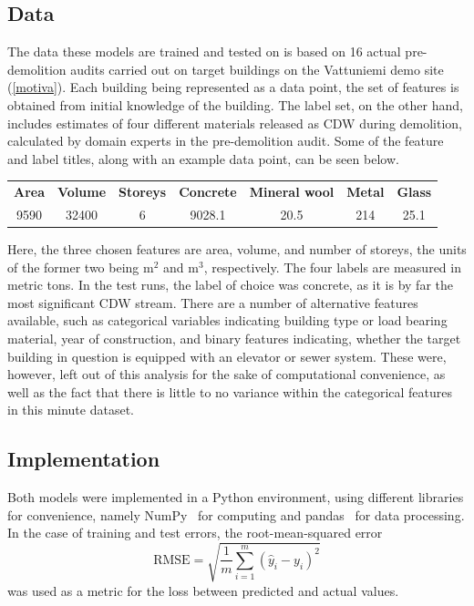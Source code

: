 \documentclass[english, 12pt, a4paper, sci, utf8, a-2b, online]{aaltothesis}
\begin{document}
\subsection{Data} \label{data}

The data these models are trained and tested on is based on 16 actual pre-demolition audits carried out on target buildings on the Vattuniemi demo site (\ref{motiva}).
Each building being represented as a data point, the set of features is obtained from initial knowledge of the building. The label set, on the other hand, includes estimates of four different
materials released as CDW during demolition, calculated by domain experts in the pre-demolition audit. Some of the feature and label titles, along with an example data point, can be seen below.

\begin{table}[h!]\label{datapoint}
  \centering
  \begin{tabular}{ccccccc}
    \textbf{Area} & \textbf{Volume} & \textbf{Storeys} & \textbf{Concrete} & \textbf{Mineral wool} & \textbf{Metal} & \textbf{Glass} \\
    9590          & 32400           & 6                & 9028.1            & 20.5                  & 214            & 25.1
  \end{tabular}
\end{table}
%
Here, the three chosen features are area, volume, and number of storeys, the units of the former two being $\text{m}^2$ and $\text{m}^3$, respectively. The four labels are measured in metric tons.
In the test runs, the label of choice was concrete, as it is by far the most significant CDW stream.
There are a number of alternative features available, such as categorical variables indicating building type or load bearing material, year of construction, and binary features indicating, whether
the target building in question is equipped with an elevator or sewer system. These were, however, left out of this analysis for the sake of computational convenience, as well as the fact that
there is little to no variance within the categorical features in this minute dataset.

\subsection{Implementation}

Both models were implemented in a Python environment, using different libraries for convenience, namely NumPy~\cite{numpy} for computing and pandas~\cite{pandas} for data processing.
In the case of training and test errors, the root-mean-squared error
\begin{equation}
  \text{RMSE} = \sqrt{\frac{1}{m}\sum_{i=1}^m(\hat{y}_i-y_i)^2}
\end{equation}
was used as a metric for the loss between predicted and actual values.
\end{document}
